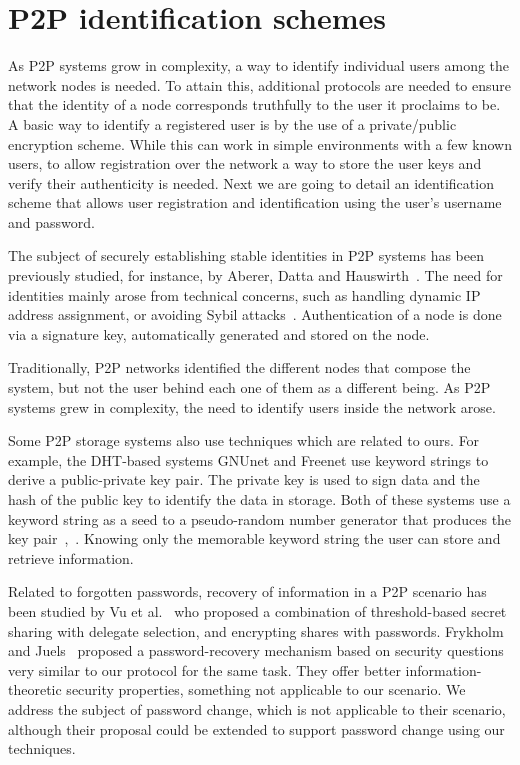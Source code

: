 \section{P2P identification schemes}

 As P2P systems grow in complexity, a way to identify individual users among the
network nodes is needed. To attain this, additional protocols are needed to
ensure that the identity of a node corresponds truthfully to the user it
proclaims to be. A basic way to identify a registered user is by the use of
a private/public encryption scheme. While this can work in simple environments
with a few known users, to allow registration over the network a way to store
the user keys and verify their authenticity is needed.
Next we are going to detail an identification scheme that allows user
registration and identification using the user's username and password.


The subject of securely establishing stable identities in P2P
systems has been previously studied, for instance, by Aberer,
Datta and Hauswirth~\cite{1318567}. The need for identities mainly arose
from technical concerns, such as handling dynamic IP address
assignment, or avoiding Sybil attacks~\cite{the_sybil_attack}. Authentication of a
node is done via a signature key, automatically generated and
stored on the node.

Traditionally, P2P networks identified the different nodes that compose the
system, but not the user behind each one of them as a different being.
As P2P systems grew in complexity, the need to identify users inside the
network arose.

Some P2P storage systems also use techniques which are
related to ours. For example, the DHT-based systems GNUnet
and Freenet use keyword strings to derive a public-private key
pair. The private key is used to sign data and the hash of
the public key to identify the data in storage. Both of
these systems use a keyword string as a seed to a pseudo-random number
generator that produces the key pair~\cite{clarke2010private},~\cite{Bennett03anencoding}.
Knowing only the memorable keyword string the user can
store and retrieve information.

Related to forgotten passwords, recovery of information in a
P2P scenario has been studied by Vu et al.~\cite{5380695} who proposed
a combination of threshold-based secret sharing with delegate
selection, and encrypting shares with passwords.
Frykholm and Juels~\cite{Frykholm:2001:EPR:501983.501985} proposed a password-recovery
mechanism based on security questions very similar to our
protocol for the same task. They offer better information-theoretic security properties, something not applicable to our
scenario. We address the subject of password change, which is not applicable to
their scenario, although their proposal could be extended to support password
change using our techniques.

